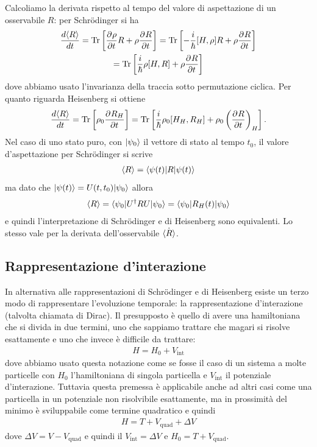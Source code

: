 Calcoliamo la derivata rispetto al tempo del valore di aspettazione di un osservabile $ R $: per Schrödinger si ha
\begin{gather}
  \frac{d \sc{R}}{dt} = \Tr\left[ \der{\rho}{t} R + \rho \der{R}{t} \right] = \Tr\left[ -\frac{i}\hbar [H, \rho] R + \rho \der{R}{t} \right]
  \\
  = \Tr\left[ \frac{i}\hbar \rho[H, R] + \rho \der{R}{t} \right]
\end{gather}
dove abbiamo usato l'invarianza della traccia sotto permutazione ciclica. Per quanto riguarda Heisenberg si ottiene
\begin{align*}
  \frac{d \sc{R}}{dt} = \Tr\left[ \rho_0 \der{R_H}{t} \right] = \Tr \left[ \frac{i}\hbar \rho_0[H_H, R_H] + \rho_0\left( \der{R}{t} \right)_H \right].
\end{align*}
Nel caso di uno stato puro, con $ \k{\psi_0} $ il vettore di stato al tempo $ t_0 $, il valore d'aspettazione per Schrödinger si scrive
\begin{align*}
  \sc{R} = \bk{\psi(t) | R | \psi(t) }
\end{align*}
ma dato che $ \k{\psi(t)} = U(t,t_0) \k{\psi_0} $ allora 
\begin{align*}
  \sc{R} = \bk{\psi_0 | U^\dag R U | \psi_0} = \bk{\psi_0 | R_H(t) | \psi_0}
\end{align*}
e quindi l'interpretazione di Schrödinger e di Heisenberg sono equivalenti. Lo stesso vale per la derivata dell'osservabile $ \dot{\sc{R}} $.

\subsection{Rappresentazione d'interazione}

In alternativa alle rappresentazioni di Schrödinger e di Heisenberg esiste un terzo modo di rappresentare l'evoluzione temporale: la rappresentazione 
d'interazione (talvolta chiamata di Dirac). Il presupposto è quello di avere una hamiltoniana che si divida in due termini, uno che sappiamo trattare 
che magari si risolve esattamente e uno che invece è difficile da trattare: 
\begin{align*}
  H = H_0 + V_{\text{int}}
\end{align*} 
dove abbiamo usato questa notazione come se fosse il caso di un sistema a molte particelle con $ H_0 $ l'hamiltoniana di singola particella e 
$ V_{\text{int}} $ il potenziale d'interazione. Tuttavia questa premessa è applicabile anche ad altri casi come una particella in un potenziale 
non risolvibile esattamente, ma in prossimità del minimo è sviluppabile come termine quadratico e quindi 
\begin{align*}
  H = T + V_{\text{quad}} + \Delta V
\end{align*}
dove $ \Delta V = V - V_{\text{quad}} $ e quindi il $ V_{\text{int}} = \Delta V $ e $ H_0 = T + V_{\text{quad}} $.

